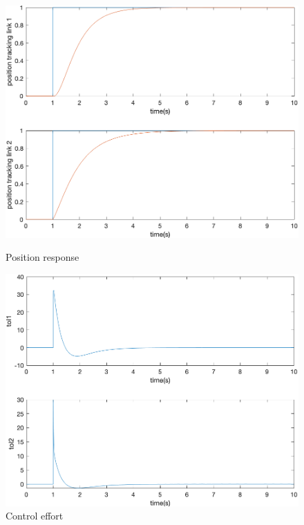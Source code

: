 \documentclass[a4paper]{article}
\begin{document}
\begin{figure}[H]
\centering
\begin{minipage}[t]{0.48\textwidth}
\centering
\includegraphics[width=\textwidth]{pic/pos.png}
\caption{Position response}
\end{minipage}
\begin{minipage}[t]{0.48\textwidth}
\centering
\includegraphics[width=\textwidth]{pic/tol.png}
\caption{Control effort}
\end{minipage}
\end{figure}

\end{document}
